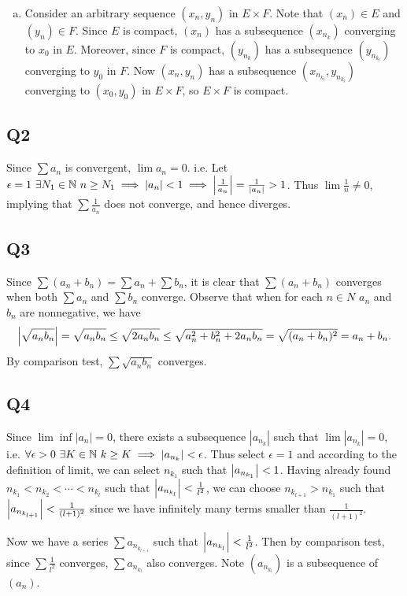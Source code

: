 \documentclass[12pt,lettersize]{article}
\newcommand{\N}{\mathbb{N}}
\begin{document}
\begin{enumerate}[(a)]
		\item Consider an arbitrary sequence $(x_n,y_n)$ in $E\times F$. Note that $(x_n)\in E$ and $(y_n)\in F$. Since $E$ is compact, $(x_n)$ has a subsequence $(x_{n_k})$ converging to $x_0$ in $E$. Moreover, since $F$ is compact, $(y_{n_k})$ has a subsequence $(y_{n_{k_l}})$ converging to $y_0$ in $F$. Now $(x_n,y_n)$ has a subsequence $(x_{n_{k_l}},y_{n_{k_l}})$ converging to $(x_0,y_0)$ in $E\times F$, so $E\times F$ is compact.
	\end{enumerate}
	\newpage
	
	\subsection*{Q2}
	Since $\sum a_n$ is convergent, $\lim a_n=0$. i.e. Let $\epsilon=1\ \exists N_1\in\N\ n\geq N_1\implies |a_n|<1\implies \abs{\frac{1}{a_n}}=\frac{1}{|a_n|}>1$. Thus $\lim\frac{1}{n}\neq 0$, implying that $\sum \frac{1}{a_n}$ does not converge, and hence diverges.
	\newpage
	
	\subsection*{Q3}
	Since $\sum(a_n+b_n)=\sum a_n+\sum b_n$, it is clear that $\sum(a_n+b_n)$ converges when both $\sum a_n$ and $\sum b_n$ converge. Observe that when for each $n\in N$ $a_n$ and $b_n$ are nonnegative, we have
	\begin{align*}
		\abs{\sqrt{a_nb_n}}=\sqrt{a_nb_n}\leq\sqrt{2a_nb_n}\leq\sqrt{a_n^2+b_n^2+2a_nb_n}=\sqrt{(a_n+b_n)^2}=a_n+b_n.
	\end{align*}
	By comparison test, $\sum\sqrt{a_nb_n}$ converges.
	\newpage
	
	\subsection*{Q4}
	Since $\lim\inf|a_n|=0$, there exists a subsequence $|a_{n_k}|$ such that $\lim|a_{n_k}|=0$, i.e. $\forall\epsilon>0\ \exists K\in\N\ k\geq K\implies \abs{a_{n_k}}<\epsilon$. Thus select $\epsilon=1$ and according to the definition of limit, we can select $n_{k_1}$ such that $\abs{a_{n_{k_1}}}<1$. Having already found $n_{k_1}<n_{k_2}<\cdots<n_{k_l}$ such that $\abs{a_{n_{k_l}}}<\frac{1}{l^2}$, we can choose $n_{k_{l+1}}>n_{k_1}$ such that $\abs{a_{n_{k_{l+1}}}}<\frac{1}{(l+1)^2}$ since we have infinitely many terms smaller than $\frac{1}{(l+1)^2}$.\smallskip
	
	Now we have a series $\sum a_{n_{k_{l+1}}}$ such that $\abs{a_{n_{k_l}}}<\frac{1}{l^2}$. Then by comparison test, since $\sum\frac{1}{l^2}$ converges, $\sum a_{n_{k_l}}$ also converges. Note $(a_{n_{k_l}})$ is a subsequence of $(a_n)$.
	\newpage
	
\end{document}
